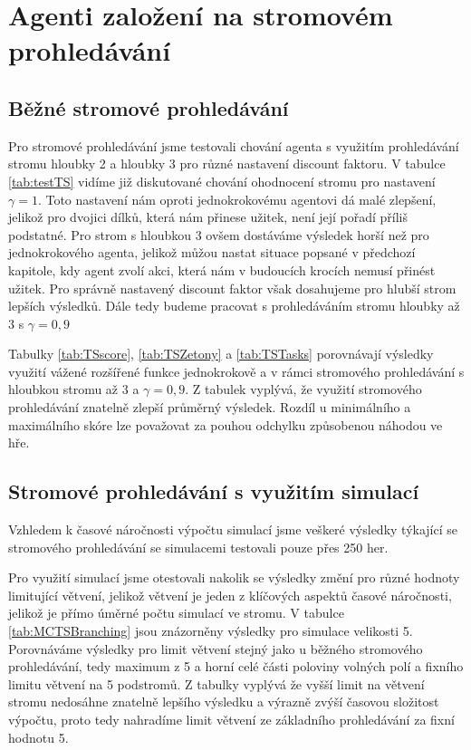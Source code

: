 \tableWeightedDetailScore
\tableWeightedDetailButtonsCats
\tableWeightedDetailTasks



\section{Agenti založení na stromovém prohledávání}

\subsection{Běžné stromové prohledávání}

Pro stromové prohledávání jsme testovali chování agenta s využitím prohledávání stromu hloubky 2 a hloubky 3 pro různé nastavení discount faktoru.
V tabulce \ref{tab:testTS} vidíme již diskutované chování ohodnocení stromu pro nastavení $\gamma = 1$. Toto nastavení nám oproti jednokrokovému agentovi dá malé zlepšení, jelikož pro dvojici dílků, která nám přinese užitek, není její pořadí příliš podstatné. Pro strom s hloubkou 3 ovšem dostáváme výsledek horší než pro jednokrokového agenta, jelikož můžou nastat situace popsané v předchozí kapitole, kdy agent zvolí akci, která nám v budoucích krocích nemusí přinést užitek. Pro správně nastavený discount faktor však dosahujeme pro hlubší strom lepších výsledků. Dále tedy budeme pracovat s prohledáváním stromu hloubky až 3 s $\gamma = 0,9$

\tableTreeSearchScoreTest

Tabulky \ref{tab:TSscore}, \ref{tab:TSZetony} a \ref{tab:TSTasks} porovnávají výsledky využití vážené rozšířené funkce jednokrokově a v rámci stromového prohledávání s hloubkou stromu až 3 a $\gamma = 0,9$. Z tabulek vyplývá, že využití stromového prohledávání znatelně zlepší průměrný výsledek. Rozdíl u minimálního a maximálního skóre lze považovat za pouhou odchylku způsobenou náhodou ve hře.

\tableTreeSearchDetailScore
\tableTreeSearchDetailButtonsCats
\tableTreeSearchDetailTasks

\subsection{Stromové prohledávání s využitím simulací}

Vzhledem k časové náročnosti výpočtu simulací jsme veškeré výsledky týkající se stromového prohledávání se simulacemi testovali pouze přes 250 her.

Pro využití simulací jsme otestovali nakolik se výsledky změní pro různé hodnoty limitující větvení, jelikož větvení je jeden z klíčových aspektů časové náročnosti, jelikož je přímo úměrné počtu simulací ve stromu. V tabulce \ref{tab:MCTSBranching} jsou znázorněny výsledky pro simulace velikosti 5. Porovnáváme výsledky pro limit větvení stejný jako u běžného stromového prohledávání, tedy maximum z 5 a horní celé části poloviny volných polí a fixního limitu větvení na 5 podstromů. Z tabulky vyplývá že vyšší limit na větvení stromu nedosáhne znatelně lepšího výsledku a výrazně zvýší časovou složitost výpočtu, proto tedy nahradíme limit větvení ze základního prohledávání za fixní hodnotu 5. 

